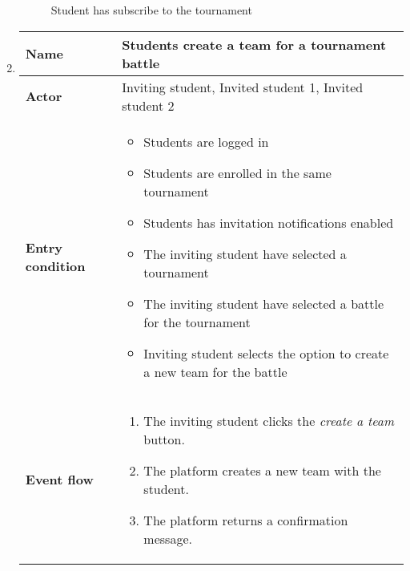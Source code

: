 \begin{enumerate}[label=\textbf{UC\arabic*}:,leftmargin=1.3cm]
            \begin{figure}[H]
                  \centering
                  \caption{Student has subscribe to the tournament}
                  \label{fig:Student has subscribe to the tournament}
            \end{figure}
            \pagebreak
      \item \textbf{}
            \begin{table}[H]
                  \centering
                  \begin{tabular}{|l|p{11.9cm}|}
                        \hline
                        \textbf{Name}            & Students create a team for a tournament battle                              \\\hline
                        \textbf{Actor}           & Inviting student, Invited student 1, Invited student 2                      \\\hline
                        \textbf{Entry condition} &
                        \begin{itemize}
                              \item Students are logged in
                              \item Students are enrolled in the same tournament
                              \item Students has invitation notifications enabled
                              \item The inviting student have selected a tournament
                              \item The inviting student have selected a battle for the tournament
                              \item Inviting student selects the option to create a new team for the battle
                        \end{itemize}                                            \\\hline
                        \textbf{Event flow}      &
                        \begin{enumerate}[label=\arabic*.]
                              \item The inviting student clicks the \emph{create a team} button.
                              \item The platform creates a new team with the student.
                              \item The platform returns a confirmation message.

\end{enumerate}
\end{tabular}
\end{table}
\end{enumerate}
